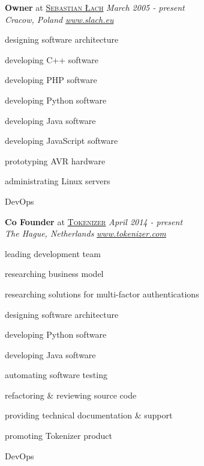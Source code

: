 \documentclass[10pt]{article}
\newenvironment{innerlist}[1][\enskip\textbullet]%
        {\begin{compactitem}[#1]}{\end{compactitem}}
\begin{document}
\textbf{Owner} at \href{http://www.slach.eu/}{\textsc{Sebastian Łach}} \hfill \textit{March 2005 - present} \\
\textit{Cracow, Poland} 
\hfill \href{http://www.slach.eu/}{\textit{www.slach.eu}} 
\vspace{0.1in}
\begin{innerlist}
\item designing software architecture
\item developing C++ software
\item developing PHP software
\item developing Python software
\item developing Java software
\item developing JavaScript software
\item prototyping AVR hardware
\item administrating Linux servers
\item DevOps
\end{innerlist}

\vspace{0.30in}

\textbf{Co Founder} at \href{https://www.tokenizer.com/}{\textsc{Tokenizer}} \hfill \textit{April 2014 - present} \\
\textit{The Hague, Netherlands}
\hfill \href{https://www.tokenizer.com/}{\textit{www.tokenizer.com}} 
\vspace{0.1in}
\begin{innerlist}
\item leading development team
\item researching business model
\item researching solutions for multi-factor authentications
\item designing software architecture
\item developing Python software
\item developing Java software
\item automating software testing
\item refactoring \& reviewing source code
\item providing technical documentation \& support
\item promoting Tokenizer product
\item DevOps
\end{innerlist}

\vspace{0.30in}
\end{document}
